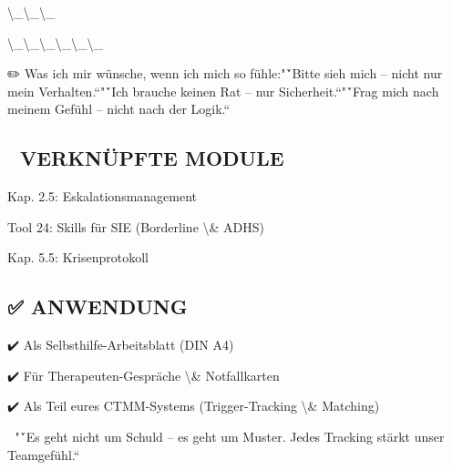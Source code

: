 \textbackslash{}_\textbackslash{}_\textbackslash{}_

\textbackslash{}_\textbackslash{}_\textbackslash{}_\textbackslash{}_\textbackslash{}_\textbackslash{}_

✏️ Was ich mir wünsche, wenn ich mich so fühle:"\'`Bitte sieh mich -- nicht nur mein Verhalten.“"\'`Ich brauche keinen Rat -- nur Sicherheit.“"\'`Frag mich nach meinem Gefühl -- nicht nach der Logik.“

\subsection{🔗 VERKNÜPFTE MODULE}

Kap. 2.5: Eskalationsmanagement

Tool 24: Skills für SIE (Borderline \textbackslash{}& ADHS)

Kap. 5.5: Krisenprotokoll

\subsection{✅ ANWENDUNG}

✔️ Als Selbsthilfe-Arbeitsblatt (DIN A4)

✔️ Für Therapeuten-Gespräche \textbackslash{}& Notfallkarten

✔️ Als Teil eures CTMM-Systems (Trigger-Tracking \textbackslash{}& Matching)

💬 "\'`Es geht nicht um Schuld -- es geht um Muster. Jedes Tracking stärkt unser Teamgefühl.“
